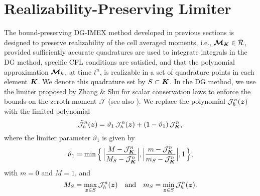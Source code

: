 \section{Realizability-Preserving Limiter}
\label{sec:limiter}

The bound-preserving DG-IMEX method developed in previous sections is designed to preserve realizability of the cell averaged moments, i.e., $\boldsymbol{\mathcal{M}}_{\boldsymbol{K}}\in\mathcal{R}$, provided sufficiently accurate quadratures are used to integrate integrals in the DG method, specific CFL conditions are satisfied, and that the polynomial approximation $\boldsymbol{\mathcal{M}}_{h}$, at time $t^{n}$, is realizable in a set of quadrature points in each element $\boldsymbol{K}$.  
We denote this quadrature set by $S\subset\boldsymbol{K}$.  
In the DG method, we use the limiter proposed by Zhang \& Shu \cite{zhangShu_2010a} for scalar conservation laws to enforce the bounds on the zeroth moment $\mathcal{J}$ (see also \cite{liuOsher_1996}).  
We replace the polynomial $\mathcal{J}_{h}^{n}(\boldsymbol{z})$ with the limited polynomial
\begin{equation}
  \tilde{\mathcal{J}}_{h}^{n}(\boldsymbol{z})
  =\vartheta_{1}\,\mathcal{J}_{h}^{n}(\boldsymbol{z})+(1-\vartheta_{1})\,\mathcal{J}_{\boldsymbol{K}}^{n},
\end{equation}
where the limiter parameter $\vartheta_{1}$ is given by
\begin{equation}
  \vartheta_{1}
  =\min\Big\{\,\Big|\frac{M-\mathcal{J}_{\boldsymbol{K}}^{n}}{M_{S}-\mathcal{J}_{\boldsymbol{K}}^{n}}\Big|,\Big|\frac{m-\mathcal{J}_{\boldsymbol{K}}^{n}}{m_{S}-\mathcal{J}_{\boldsymbol{K}}^{n}}\Big|,1\,\Big\},
\end{equation}
with $m=0$ and $M=1$, and
\begin{equation}
  M_{S}=\max_{\boldsymbol{z}\in S}\mathcal{J}_{h}^{n}(\boldsymbol{z})
  \quad\text{and}\quad
  m_{S}=\min_{\boldsymbol{z}\in S}\mathcal{J}_{h}^{n}(\boldsymbol{z}).  
\end{equation}

